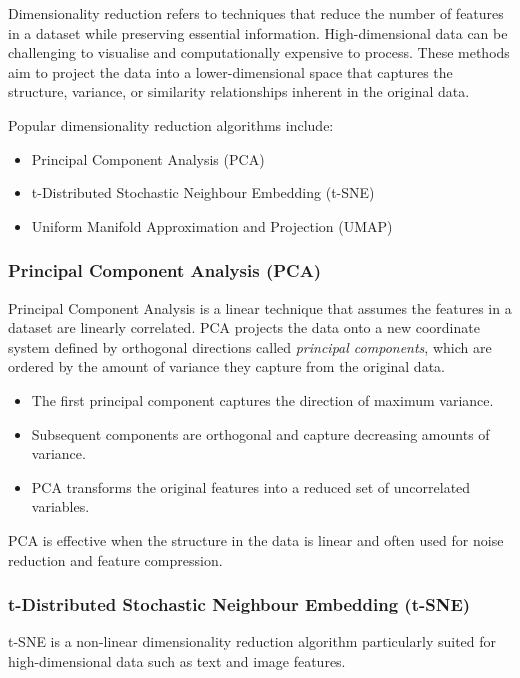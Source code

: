\documentclass[9pt]{extarticle}
\begin{document}
Dimensionality reduction refers to techniques that reduce the number of features in a dataset while preserving essential information. High-dimensional data can be challenging to visualise and computationally expensive to process. These methods aim to project the data into a lower-dimensional space that captures the structure, variance, or similarity relationships inherent in the original data.

Popular dimensionality reduction algorithms include:
\begin{itemize}
    \item Principal Component Analysis (PCA)
    \item t-Distributed Stochastic Neighbour Embedding (t-SNE)
    \item Uniform Manifold Approximation and Projection (UMAP)
\end{itemize}

\subsubsection{Principal Component Analysis (PCA)}

Principal Component Analysis is a linear technique that assumes the features in a dataset are linearly correlated. PCA projects the data onto a new coordinate system defined by orthogonal directions called \textit{principal components}, which are ordered by the amount of variance they capture from the original data.

\begin{itemize}
    \item The first principal component captures the direction of maximum variance.
    \item Subsequent components are orthogonal and capture decreasing amounts of variance.
    \item PCA transforms the original features into a reduced set of uncorrelated variables.
\end{itemize}

PCA is effective when the structure in the data is linear and often used for noise reduction and feature compression.

\subsubsection{t-Distributed Stochastic Neighbour Embedding (t-SNE)}

t-SNE is a non-linear dimensionality reduction algorithm particularly suited for high-dimensional data such as text and image features.
\end{document}
